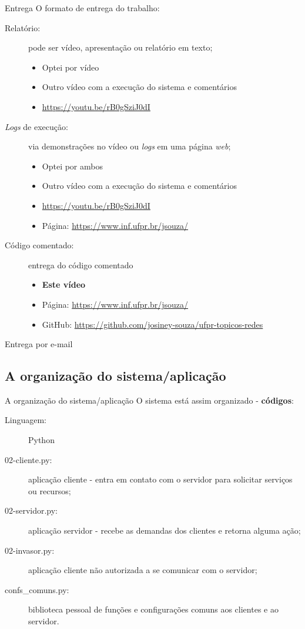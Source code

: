 \documentclass[xcolor=dvipsnames,table]{beamer}
\begin{document}
\begin{frame}{Entrega}
	O formato de entrega do trabalho:
	\begin{description}
		\item[Relatório:] pode ser vídeo, apresentação ou relatório em texto;
		\begin{itemize}
			\item Optei por vídeo
			\item Outro vídeo com a execução do sistema e comentários
			\item \url{https://youtu.be/rB0gSziJ0dI}
		\end{itemize} \pause
		
		\item[\textit{Logs} de execução:] via demonstrações no vídeo ou \textit{logs} em uma página \textit{web};
		\begin{itemize}
			\item Optei por ambos
			\item Outro vídeo com a execução do sistema e comentários
			\item \url{https://youtu.be/rB0gSziJ0dI}
			\item Página: \url{https://www.inf.ufpr.br/jsouza/}
		\end{itemize} \pause
		
		\item[Código comentado:] entrega do código comentado
		\begin{itemize}
			\item \textbf{Este vídeo}
			\item Página: \url{https://www.inf.ufpr.br/jsouza/}
			\item GitHub: \url{https://github.com/josiney-souza/ufpr-topicos-redes}
		\end{itemize}
	\end{description}
	Entrega por e-mail
\end{frame}

\subsection{A organização do sistema/aplicação}
\begin{frame}{A organização do sistema/aplicação}
	O sistema está assim organizado - \textbf{códigos}:
	\begin{description}
		\item[Linguagem:] Python
		\item[02-cliente.py:] aplicação cliente - entra em contato com o servidor para solicitar serviços ou recursos;
		\item[02-servidor.py:] aplicação servidor - recebe as demandas dos clientes e retorna alguma ação;
		\item[02-invasor.py:] aplicação cliente não autorizada a se comunicar com o servidor;
		\item[confs\_comuns.py:] biblioteca pessoal de funções e configurações comuns aos clientes e ao servidor.
	\end{description}
\end{frame}
\end{document}
